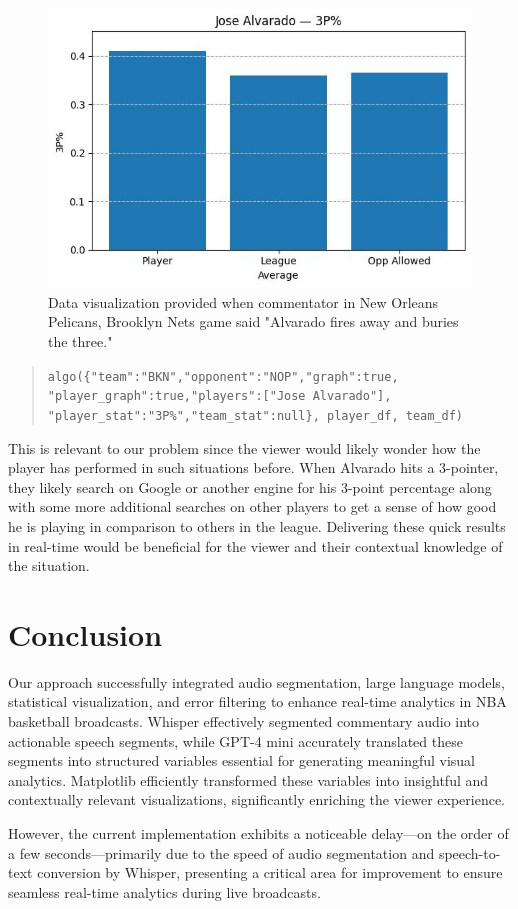 \documentclass{article}
\begin{document}
\begin{figure}
    \centering
    \includegraphics[width=0.5\linewidth]{JoseAlvarado.jpg}
    \caption{Data visualization provided when commentator in New Orleans Pelicans, Brooklyn Nets game said "Alvarado fires away and buries the three."}
    \label{fig:enter-label}
\end{figure}
\begin{quote}
\verb|algo({"team":"BKN","opponent":"NOP","graph":true,|
\verb|"player_graph":true,"players":["Jose Alvarado"],|
\verb|"player_stat":"3P%","team_stat":null}, player_df, team_df)|
\end{quote}

This is relevant to our problem since the viewer would likely wonder how the player has performed in such situations before. When Alvarado hits a 3-pointer, they likely search on Google or another engine for his 3-point percentage along with some more additional searches on other players to get a sense of how good he is playing in comparison to others in the league. Delivering these quick results in real-time would be beneficial for the viewer and their contextual knowledge of the situation.


\section{Conclusion}

Our approach successfully integrated audio segmentation, large language models, statistical visualization, and error filtering to enhance real-time analytics in NBA basketball broadcasts. Whisper effectively segmented commentary audio into actionable speech segments, while GPT-4 mini accurately translated these segments into structured variables essential for generating meaningful visual analytics. Matplotlib efficiently transformed these variables into insightful and contextually relevant visualizations, significantly enriching the viewer experience.

However, the current implementation exhibits a noticeable delay—on the order of a few seconds—primarily due to the speed of audio segmentation and speech-to-text conversion by Whisper, presenting a critical area for improvement to ensure seamless real-time analytics during live broadcasts.
\end{document}
